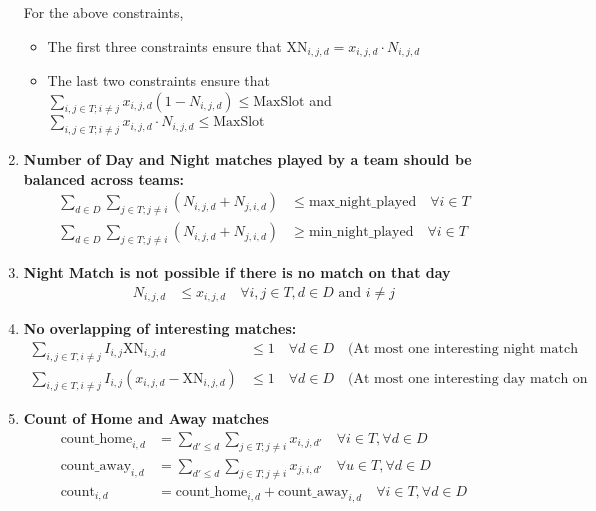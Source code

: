 \documentclass[a4paper, 12pt]{article}
\begin{document}
\begin{enumerate}
    For the above constraints,
    \begin{itemize}
        \item The first three constraints ensure that $\text{XN}_{i,j,d} = x_{i,j,d}\cdot N_{i,j,d}$
        \item The last two constraints ensure that $\sum_{i,j \in T; i \neq j} x_{i,j,d}(1 - N_{i,j,d}) \leq \text{MaxSlot}$ and $\sum_{i,j \in T; i \neq j} x_{i,j,d}\cdot N_{i,j,d} \leq \text{MaxSlot}$
    \end{itemize}

    \item \textbf{Number of Day and Night matches played by a team should be balanced across teams:}
    \begin{align*}
        \sum_{d \in D} \sum_{j \in T; j \neq i} (N_{i,j,d} + N_{j,i,d}) &\leq \text{max\_night\_played} \quad \forall i \in T\\
        \sum_{d \in D} \sum_{j \in T; j \neq i} (N_{i,j,d} + N_{j,i,d})
        &\geq \text{min\_night\_played} \quad \forall i \in T
    \end{align*}

    \item \textbf{Night Match is not possible if there is no match on that day}
    \begin{align*}
        N_{i,j,d} &\leq x_{i,j,d} \quad \forall i,j \in T, d \in D \text{ and } i \neq j
    \end{align*}

    \item \textbf{No overlapping of interesting matches:}
    \begin{align*}
        \sum_{i,j \in T, i \neq j} I_{i,j} \text{XN}_{i,j,d} &\leq 1 \quad \forall d \in D \quad \text{(At most one interesting night match on a weekend)}\\
        \sum_{i,j \in T, i \neq j} I_{i,j} (x_{i,j,d} - \text{XN}_{i,j,d}) &\leq 1 \quad \forall d \in D \quad \text{(At most one interesting day match on a weekend)}
    \end{align*}

    \item \textbf{Count of Home and Away matches}
    \begin{align*}
        \text{count\_home}_{i,d} &= \sum_{d' \leq d} \sum_{j \in T; j \neq i} x_{i,j,d'} \quad \forall i \in T , \forall d \in D \\
        \text{count\_away}_{i,d} &= \sum_{d' \leq d} \sum_{j \in T; j \neq i} x_{j,i,d'} \quad \forall u \in T, \forall d \in D \\
        \text{count}_{i,d} &= \text{count\_home}_{i,d} + \text{count\_away}_{i,d} \quad \forall i \in T, \forall d \in D
    \end{align*}


\end{enumerate}
\end{document}
